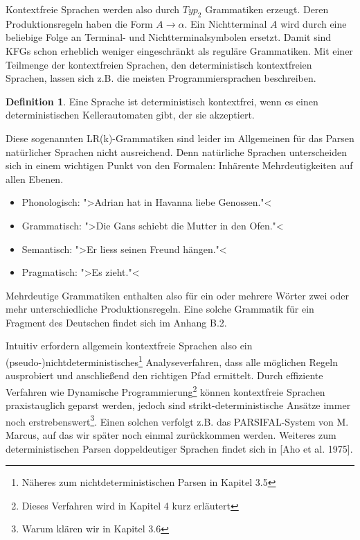 \documentclass[12pt,a4paper]{article}
\theoremstyle{definition}
\begin{document}
			Kontextfreie Sprachen werden also durch $Typ_2$ Grammatiken erzeugt. Deren Produktionsregeln haben die Form $A \rightarrow \alpha$. Ein Nichtterminal $A$ wird durch eine beliebige Folge an Terminal- und Nichtterminalsymbolen ersetzt. Damit sind KFGs schon erheblich weniger eingeschränkt als reguläre Grammatiken. Mit einer Teilmenge der kontextfreien Sprachen, den deterministisch kontextfreien Sprachen, lassen sich z.B. die meisten Programmiersprachen beschreiben.
			
				\newtheorem{det-cfg}{Definition}[subsubsection]
				\begin{det-cfg}
					Eine Sprache ist deterministisch kontextfrei, wenn es einen  deterministischen
					Kellerautomaten gibt, der sie akzeptiert.
				\end{det-cfg}
			
			Diese sogenannten LR(k)-Grammatiken sind leider im Allgemeinen für das Parsen natürlicher Sprachen nicht ausreichend. Denn natürliche Sprachen unterscheiden sich in einem wichtigen Punkt von den Formalen: Inhärente Mehrdeutigkeiten auf allen Ebenen.
			
				\begin{itemize}
				\item{Phonologisch: ">Adrian hat in Havanna liebe Genossen."<}
				\item{Grammatisch: ">Die Gans schiebt die Mutter in den Ofen."<}
				\item{Semantisch: ">Er liess seinen Freund hängen."<}
				\item{Pragmatisch: ">Es zieht."<}
				\end{itemize}
			
			Mehrdeutige Grammatiken enthalten also für ein oder mehrere Wörter zwei oder mehr unterschiedliche Produktionsregeln. Eine solche Grammatik für ein Fragment des Deutschen findet sich im Anhang B.2.
			
			Intuitiv erfordern allgemein kontextfreie Sprachen also ein (pseudo-)nichtdeterministisches\footnote{Näheres zum nichtdeterministischen Parsen in Kapitel 3.5} Analyseverfahren, dass alle möglichen Regeln ausprobiert und anschließend den richtigen Pfad ermittelt. Durch effiziente Verfahren wie Dynamische Programmierung\footnote{Dieses Verfahren wird in Kapitel 4 kurz erläutert} können kontextfreie Sprachen praxistauglich geparst werden, jedoch sind strikt-deterministische Ansätze immer noch erstrebenswert\footnote{Warum klären wir in Kapitel 3.6}. Einen solchen verfolgt z.B. das PARSIFAL-System von M. Marcus, auf das wir später noch einmal zurückkommen werden. Weiteres zum deterministischen Parsen doppeldeutiger Sprachen findet sich in [Aho et al. 1975].
			
\end{document}
